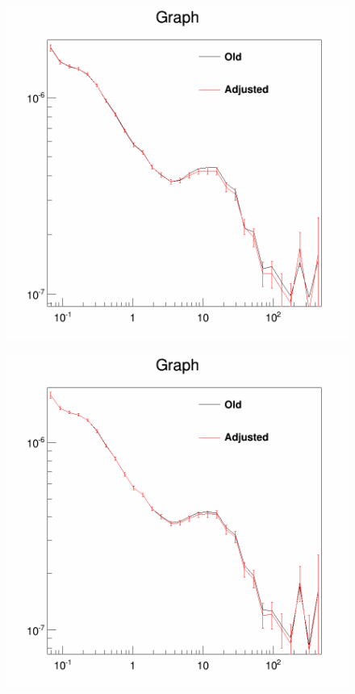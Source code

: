 \begin{figure}[H]
\begin{minipage}[h]{0.45\textwidth}
	\includegraphics[width=1.\linewidth]{pic/method/app_iso_process_2.png}
  	\subcaption{}
  	\label{app:app_iso_process_2}
  \end{minipage}
  \hfill
  \begin{minipage}[h]{0.45\textwidth}
  	\centering
	\includegraphics[width=1\linewidth]{pic/method/app_iso_process_3.png}

\end{minipage}
\end{figure}
